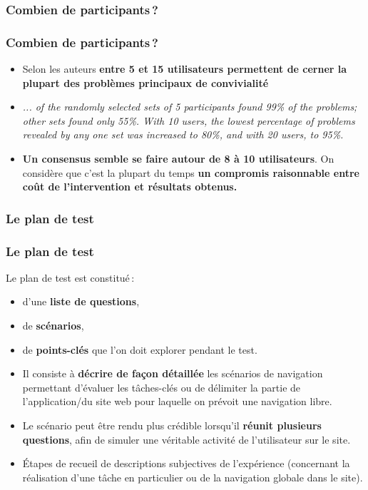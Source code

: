 			\subsubsection{Combien de participants\,?} 
			\begin{frame}[allowframebreaks]
			\frametitle{Combien de participants\,?}
				\begin {itemize}
				\item Selon les auteurs \textbf{entre 5 et 15 utilisateurs permettent de cerner la plupart des problèmes principaux de convivialité} \citep{nielsen1993a}\citep{spool2001a} \citep{cockton2008a} 
				\item \textit{... of the randomly selected sets of 5 participants found
99\% of the problems; other sets found only 55\%. With 10 users, the lowest percentage of problems revealed
by any one set was increased to 80\%, and with 20 users, to 95\%.}  \citep{cockton2008a}
				\item \textbf{Un consensus semble se faire autour de 8 à 10 utilisateurs}. On considère que c'est la plupart du temps \textbf{un compromis raisonnable entre coût de l'intervention et résultats obtenus. } \citep{ergolab2014a}
				\end{itemize} 
			\end{frame} 
			
			
			\subsubsection{Le plan de test} 
			\begin{frame}[allowframebreaks]
			\frametitle{Le plan de test \citep{ergolab2014a}}
				Le plan de test est constitué\,:
				\begin{itemize}
				\item d’une \textbf{liste de questions}, 
				\item de \textbf{scénarios}, 
				\item de \textbf{points-clés} que l’on doit explorer pendant le test.
				\end{itemize} 
				\framebreak
				\begin{itemize}
				\item Il consiste à \textbf{décrire de façon détaillée} les scénarios de navigation permettant d’évaluer les tâches-clés ou de délimiter la partie de l’application/du site web pour laquelle on prévoit une navigation libre.
				\item Le scénario peut être rendu plus crédible lorsqu’il \textbf{réunit plusieurs questions}, afin de simuler une véritable activité de l’utilisateur sur le site.
				\item Étapes de recueil de descriptions subjectives de l’expérience (concernant la réalisation d’une tâche en particulier ou de la navigation globale dans le site).
				\end{itemize} 
				\end{frame} 
				
